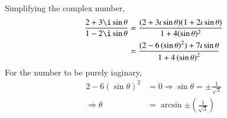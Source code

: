 Simplifying the complex number,
%
\begin{align}
\frac{2+3 \i\sin\theta}{1-2\i\sin\theta} 
&= 
\frac{(2+3\iota\sin\theta)(1+2\iota\sin\theta)}{1+4(\sin\theta)^2}
\\
&=\frac{(2-6\left(\sin\theta\right)^2)+7\iota\sin\theta}{1+4\left(\sin\theta\right)^2}
\end{align}
For the number to be purely iaginary, 
\begin{align}
2-6\left(\sin\theta\right)^2&=0
\Rightarrow
\sin\theta=\pm\frac{1}{\sqrt{3}} 
\\
\Rightarrow 
\theta&=\arcsin{\pm\left(\frac{1}{\sqrt{3}}\right)}   
\end{align}
